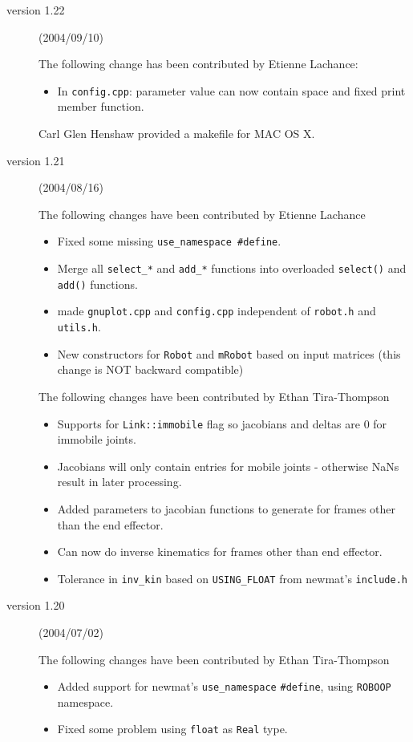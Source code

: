 \documentclass[11pt,fleqn,letterpaper]{report}
\begin{document}
\begin{description}
\item[version 1.22] (2004/09/10) 

  The following change has been contributed by Etienne Lachance:
  \begin{itemize}
  \item In \texttt{config.cpp}: parameter value can now contain space
    and fixed print member function.
  \end{itemize}
  Carl Glen Henshaw provided a makefile for MAC OS X.

\item[version 1.21] (2004/08/16) 

  The following changes have been contributed by Etienne Lachance
  \begin{itemize}
  \item Fixed some missing \texttt{use\_namespace \#define}.
  \item Merge all \texttt{select\_*} and \texttt{add\_*} functions
    into overloaded \texttt{select()} and \texttt{add()} functions.
  \item made \texttt{gnuplot.cpp} and \texttt{config.cpp} independent
    of \texttt{robot.h} and \texttt{utils.h}.
  \item New constructors for \texttt{Robot} and \texttt{mRobot} based
    on input matrices (this change is NOT backward compatible)
  \end{itemize}
  The following changes have been contributed by Ethan Tira-Thompson
  \begin{itemize}
  \item Supports for \texttt{Link::immobile} flag so jacobians and
    deltas are 0 for immobile joints.
  \item Jacobians will only contain entries for mobile joints -
    otherwise NaNs result in later processing.
  \item Added parameters to jacobian functions to generate for frames
    other than the end effector.
  \item Can now do inverse kinematics for frames other than end
    effector.
  \item Tolerance in \texttt{inv\_kin} based on \texttt{USING\_FLOAT}
    from newmat's \texttt{include.h}
  \end{itemize}

\item[version 1.20] (2004/07/02) 

  The following changes have been contributed by Ethan Tira-Thompson

  \begin{itemize}
  \item Added support for newmat's \texttt{use\_namespace}
    \texttt{\#define}, using \texttt{ROBOOP} namespace.
  \item Fixed some problem using \texttt{float} as \texttt{Real} type.
  \end{itemize}


\end{description}
\end{document}
